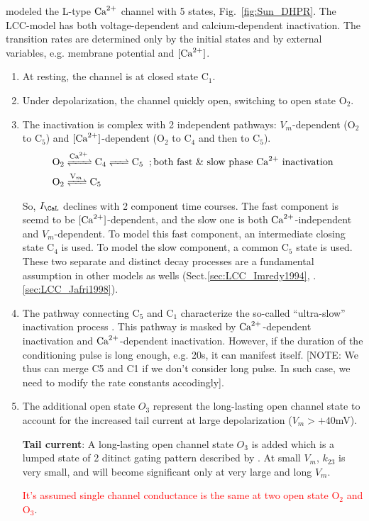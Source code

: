 \citep{sun2000mlc} modeled the L-type ${\text{Ca}^{2+}}$ channel with 5 states,
Fig.~\ref{fig:Sun_DHPR}. The LCC-model has both voltage-dependent and
calcium-dependent inactivation. The transition rates are determined only by the
initial states and by external variables, e.g. membrane potential and $[{\text{Ca}^{2+}}]$.
\begin{enumerate}
  \item At resting, the channel is at closed state C$_1$. 
  \item Under depolarization, the channel quickly open, switching to open state
  O$_2$. 
  \item The inactivation is complex with 2 independent pathways: $V_m$-dependent
  (O$_2$ to C$_5$) and $[{\text{Ca}^{2+}}]$-dependent (O$_2$ to C$_4$ and then to C$_5$). 
\begin{equation}
  \label{eq:867}
  \begin{split}
    \ce{O2 &<=>[\Ca] C4 <=> C5 } \;\; ; \text{both fast \& slow
      phase $\Ca$ inactivation}\\
    \ce{O2 &<=>[V_m] C5 }
  \end{split} 
\end{equation}
  
  So, $I_\CaL$ declines with 2 component time courses. The fast component is
  seemd to be $[{\text{Ca}^{2+}}]$-dependent, and the slow one is both ${\text{Ca}^{2+}}$-independent and
  $V_m$-dependent. To model this fast component, an intermediate closing state
  C$_4$ is used. To model the slow component, a common C$_5$ state is used.
  These two separate and distinct decay processes are a fundamental assumption
  in other models as wells (Sect.\ref{sec:LCC_Imredy1994}, .\ref{sec:LCC_Jafri1998}).
   
   \item The pathway connecting C$_5$ and C$_1$ characterize the
   so-called ``ultra-slow'' inactivation process \citep{boyett1994}. This
   pathway is masked by ${\text{Ca}^{2+}}$-dependent inactivation and ${\text{Ca}^{2+}}$-dependent
   inactivation. However, if the duration of the conditioning pulse is long
   enough, e.g. 20s, it can manifest itself. [NOTE: We thus can merge C5 and C1
   if we don't consider long pulse. In such case, we need to modify the rate
   constants accodingly].
    
    \item The additional open state $O_3$ represent the long-lasting open
    channel state to account for the increased tail current at large
    depolarization ($V_m> +40$mV).

{\bf Tail current}: A long-lasting open channel state $O_3$ is added which is a
lumped state of 2 ditinct gating pattern described by \citep{pietrobon1990}. At
small $V_m$, $k_{23}$ is very small, and will become significant only at very
large and long $V_m$.

    \textcolor{red}{It's assumed single channel conductance is the same at two
    open state O$_2$ and O$_3$}.
\end{enumerate}


